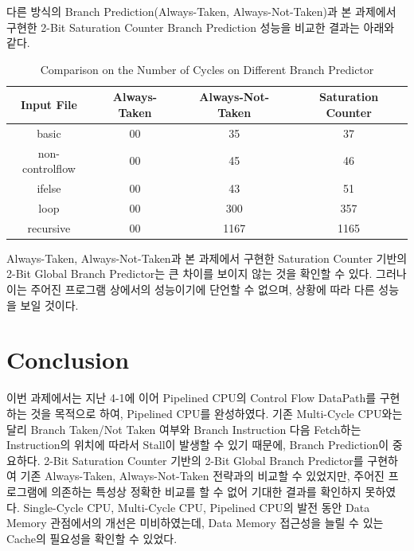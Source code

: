 \documentclass[openright, a4paper]{article}
\begin{document}
다른 방식의 Branch Prediction(Always-Taken, Always-Not-Taken)과 본 과제에서 구현한 2-Bit Saturation Counter Branch Prediction 성능을 비교한 결과는 아래와 같다.

\begin{table}[!h]
  \centering
  \begin{tabular}{@{}cccc@{}}
    \hline
    Input File & Always-Taken & Always-Not-Taken & Saturation Counter \\
    \hline
    basic & 00 & 35 & 37 \\
    non-controlflow & 00 & 45 & 46 \\
    ifelse & 00 & 43 & 51 \\
    loop & 00 & 300 & 357 \\
    recursive & 00 & 1167 & 1165 \\
    \hline
  \end{tabular}
  \caption{Comparison on the Number of Cycles on Different Branch Predictor}
  \label{tab:comparison}
\end{table}

Always-Taken, Always-Not-Taken과 본 과제에서 구현한 Saturation Counter 기반의 2-Bit Global Branch Predictor는 큰 차이를 보이지 않는 것을 확인할 수 있다.
그러나 이는 주어진 프로그램 상에서의 성능이기에 단언할 수 없으며, 상황에 따라 다른 성능을 보일 것이다.



\section{Conclusion}

이번 과제에서는 지난 4-1에 이어 Pipelined CPU의 Control Flow DataPath를 구현하는 것을 목적으로 하여, Pipelined CPU를 완성하였다.
기존 Multi-Cycle CPU와는 달리 Branch Taken/Not Taken 여부와 Branch Instruction 다음 Fetch하는 Instruction의 위치에 따라서 Stall이 발생할 수 있기 때문에, Branch Prediction이 중요하다.
2-Bit Saturation Counter 기반의 2-Bit Global Branch Predictor를 구현하여 기존 Always-Taken, Always-Not-Taken 전략과의 비교할 수 있었지만, 주어진 프로그램에 의존하는 특성상 정확한 비교를 할 수 없어 기대한 결과를 확인하지 못하였다.
Single-Cycle CPU, Multi-Cycle CPU, Pipelined CPU의 발전 동안 Data Memory 관점에서의 개선은 미비하였는데, Data Memory 접근성을 늘릴 수 있는 Cache의 필요성을 확인할 수 있었다.
\end{document}
